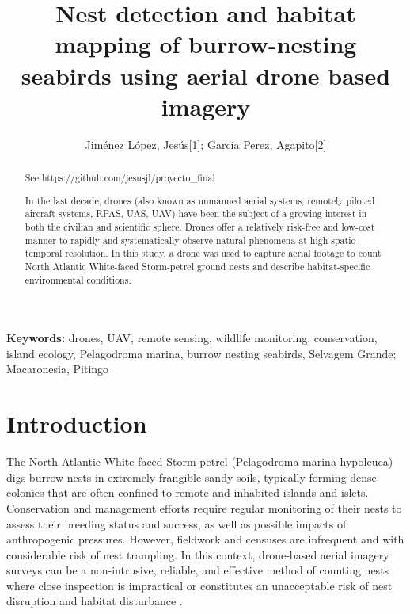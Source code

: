\documentclass[12pt]{article}
\begin{document}
\title{Nest detection and habitat mapping of burrow-nesting seabirds using aerial drone based imagery}

\author{Jiménez López, Jesús[1]; García Perez, Agapito[2]}


\maketitle
\begin{abstract}
	
See https://github.com/jesusjl/proyecto\_final

In the last decade, drones (also known as unmanned aerial systems, remotely piloted aircraft systems, RPAS, UAS, UAV) have been the subject of a growing interest in both the civilian and scientific sphere. Drones offer a relatively risk-free and low-cost manner to rapidly and systematically observe natural phenomena at high spatio-temporal resolution. In this study, a drone was used to capture aerial footage to count North Atlantic White-faced Storm-petrel ground nests and describe habitat-specific environmental conditions.

\end{abstract}

{\bf Keywords:} drones, UAV, remote sensing, wildlife monitoring, conservation, island ecology, Pelagodroma marina, burrow nesting seabirds, Selvagem Grande; Macaronesia, Pitingo

\section{Introduction}

The North Atlantic White-faced Storm-petrel (Pelagodroma marina hypoleuca) digs burrow nests in extremely frangible sandy soils, typically forming dense colonies that are often confined to remote and inhabited islands and islets. Conservation and management efforts require regular monitoring of their nests to assess their breeding status and success, as well as possible impacts of anthropogenic pressures. However, fieldwork and censuses are infrequent and with considerable risk of nest trampling. In this context, drone-based aerial imagery surveys \cite{ventura_mapping_2018} can be a non-intrusive, reliable, and effective method of counting nests where close inspection is impractical or constitutes an unacceptable risk of nest disruption and habitat disturbance . 
\end{document}
